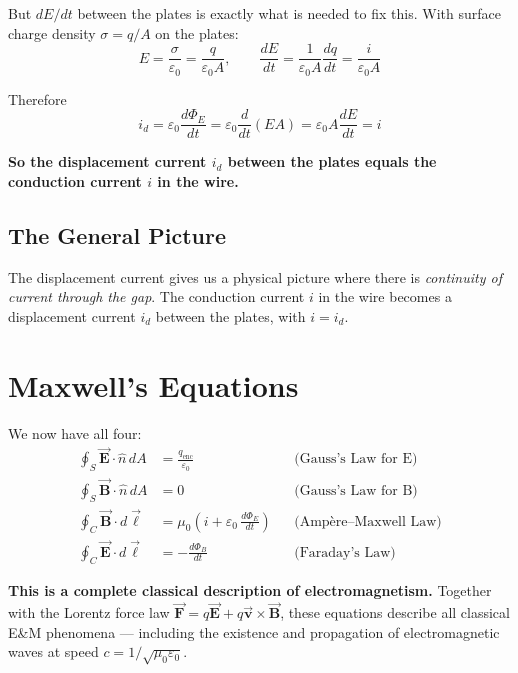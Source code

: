 \documentclass[11pt]{report}
\newcommand{\vbf}[1]{\vec{\mathbf{#1}}}
\newcommand{\nhat}{\hat{n}}
\begin{document}
But $dE/dt$ between the plates is exactly what is needed to fix this. With surface charge density $\sigma = q/A$ on the plates:
\begin{equation}
E = \frac{\sigma}{\varepsilon_0} = \frac{q}{\varepsilon_0 A}, \qquad \frac{dE}{dt} = \frac{1}{\varepsilon_0 A}\frac{dq}{dt} = \frac{i}{\varepsilon_0 A}
\end{equation}

Therefore
\begin{equation}
i_d = \varepsilon_0\frac{d\Phi_E}{dt} = \varepsilon_0\frac{d}{dt}(EA) = \varepsilon_0 A\frac{dE}{dt} = i
\end{equation}

\textbf{So the displacement current $i_d$ between the plates equals the conduction current $i$ in the wire.}

\subsection*{The General Picture}

The displacement current gives us a physical picture where there is \emph{continuity of current through the gap}. The conduction current $i$ in the wire becomes a displacement current $i_d$ between the plates, with $i = i_d$.

\section{Maxwell's Equations}

We now have all four:
\begin{align}
\oint_S \vbf{E}\cdot\nhat\, dA &= \frac{q_{\text{enc}}}{\varepsilon_0} && \text{(Gauss's Law for E)} \\
\oint_S \vbf{B}\cdot\nhat\, dA &= 0 && \text{(Gauss's Law for B)} \\
\oint_C \vbf{B}\cdot d\vbf{\ell} &= \mu_0\!\left(i + \varepsilon_0\,\frac{d\Phi_E}{dt}\right) && \text{(Amp\`ere--Maxwell Law)} \\
\oint_C \vbf{E}\cdot d\vbf{\ell} &= -\frac{d\Phi_B}{dt} && \text{(Faraday's Law)}
\end{align}

\textbf{This is a complete classical description of electromagnetism.} Together with the Lorentz force law $\vbf{F} = q\vbf{E} + q\vbf{v}\times\vbf{B}$, these equations describe all classical E\&M phenomena --- including the existence and propagation of electromagnetic waves at speed $c = 1/\sqrt{\mu_0\varepsilon_0}$.
\end{document}
